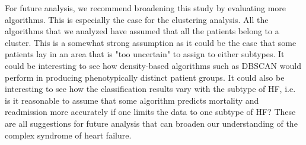 \documentclass[../thesis.tex]{subfiles}
\begin{document}
\indent For future analysis, we recommend broadening this study by evaluating more algorithms. This is especially the case for the clustering analysis. All the algorithms that we analyzed have assumed that all the patients belong to a cluster. This is a somewhat strong assumption as it could be the case that some patients lay in an area that is "too uncertain" to assign to either subtypes. It could be interesting to see how density-based algorithms such as DBSCAN \citep{ester1996density} would perform in producing phenotypically distinct patient groups. It could also be interesting to see how the classification results vary with the subtype of HF, i.e. is it reasonable to assume that some algorithm predicts mortality and readmission more accurately if one limits the data to one subtype of HF? These are all suggestions for future analysis that can broaden our understanding of the complex syndrome of heart failure. 
\end{document}
